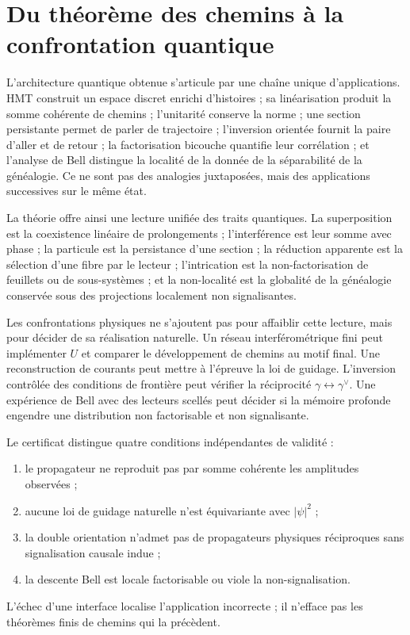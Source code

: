 \section{Du théorème des chemins à la confrontation quantique}

L'architecture quantique obtenue s'articule par une chaîne unique d'applications. HMT
construit un espace discret enrichi d'histoires ; sa linéarisation produit la
somme cohérente de chemins ; l'unitarité conserve la norme ; une section
persistante permet de parler de trajectoire ; l'inversion orientée fournit la paire
d'aller et de retour ; la factorisation bicouche quantifie leur corrélation ; et l'analyse de
Bell distingue la localité de la donnée de la séparabilité de la généalogie. Ce ne sont pas
des analogies juxtaposées, mais des applications successives sur le même état.

La théorie offre ainsi une lecture unifiée des traits quantiques. La
superposition est la coexistence linéaire de prolongements ; l'interférence est leur
somme avec phase ; la particule est la persistance d'une section ; la réduction apparente
est la sélection d'une fibre par le lecteur ; l'intrication est la non-factorisation
de feuillets ou de sous-systèmes ; et la non-localité est la globalité de la
généalogie conservée sous des projections localement non signalisantes.

Les confrontations physiques ne s'ajoutent pas pour affaiblir cette lecture, mais pour décider
de sa réalisation naturelle. Un réseau interférométrique fini peut implémenter \(U\) et
comparer le développement de chemins au motif final. Une reconstruction de
courants peut mettre à l'épreuve la loi de guidage. L'inversion contrôlée des
conditions de frontière peut vérifier la réciprocité
\(\gamma\leftrightarrow\gamma^\vee\). Une expérience de Bell avec des lecteurs scellés
peut décider si la mémoire profonde engendre une distribution non factorisable et non
signalisante.

\begin{test}
Le certificat distingue quatre conditions indépendantes de validité :
\begin{enumerate}
  \item le propagateur ne reproduit pas par somme cohérente les amplitudes observées ;
  \item aucune loi de guidage naturelle n'est équivariante avec \(|\psi|^2\) ;
  \item la double orientation n'admet pas de propagateurs physiques réciproques sans
  signalisation causale indue ;
  \item la descente Bell est locale factorisable ou viole la non-signalisation.
\end{enumerate}
L'échec d'une interface localise l'application incorrecte ; il n'efface pas les théorèmes finis
de chemins qui la précèdent.
\end{test}

